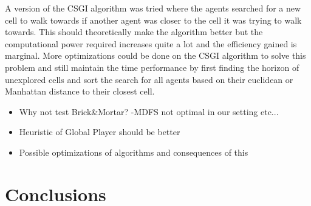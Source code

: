 \documentclass{article}
\begin{document}
A version of the CSGI algorithm was tried where the agents searched for a new cell to walk towards if another agent was closer to the cell it was trying to walk towards. This should theoretically make the algorithm better but the computational power required increases quite a lot and the efficiency gained is marginal. More optimizations could be done on the CSGI algorithm to solve this problem and still maintain the time performance by first finding the horizon of unexplored cells and sort the search for all agents based on their euclidean or Manhattan distance to their closest cell.




\begin{itemize}
    \item Why not test Brick\&Mortar? -MDFS not optimal in our setting etc...
    \item Heuristic of Global Player should be better
    \item Possible optimizations of algorithms and consequences of this
\end{itemize}

\section{Conclusions}




\end{document}
